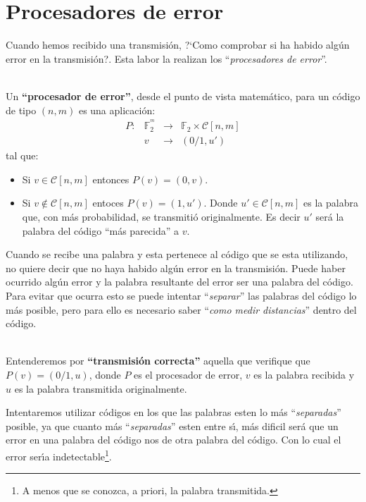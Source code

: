 \section{Procesadores de error}\label{sec:ProcErr}

Cuando hemos recibido una transmisi\'on, ?`Como comprobar si ha habido alg\'un
error en la transmisi\'on?. Esta labor la realizan los ``\emph{procesadores de
error}''.
\begin{definicion}
\ \\
Un \textbf{``procesador de error''}, desde el punto de vista matem\'atico, 
para un c\'odigo de tipo $(n,m)$ es una aplicaci\'on:
\begin{displaymath}
\begin{array}{cccc}
P:&\mathbb{F}^{^m}_2&\longrightarrow & \mathbb{F}_2\times \mathcal{C}[n,m] \\
 & v&\longrightarrow & (0/1,u')
\end{array}
\end{displaymath}
tal que:
\begin{itemize}
\item Si $v \in \mathcal{C}[n,m]$ entonces $P(v)=(0,v)$.
\item Si $v \notin \mathcal{C}[n,m]$ entoces $P(v)=(1,u')$. Donde $u'\in
\mathcal{C}[n,m]$ es la palabra que, con m\'as probabilidad, se transmiti\'o
originalmente. Es decir $u'$ ser\'a la palabra del c\'odigo ``m\'as parecida''
a $v$.
\end{itemize}
\end{definicion}
%
Cuando se recibe una palabra y esta pertenece al c\'odigo que se esta utilizando, no quiere decir que no haya habido alg\'un error en la transmisi\'on. Puede haber ocurrido alg\'un error y la palabra resultante del error ser una palabra del c\'odigo. Para evitar que ocurra esto se puede intentar ``\emph{separar}'' las palabras del c\'odigo lo m\'as posible, pero para ello es necesario saber ``\emph{como medir distancias}'' dentro del c\'odigo.
%
\begin{definicion}
\ \\
Entenderemos por \textbf{``transmisi\'on correcta''} aquella que verifique que $P(v)=(0/1,u)$, donde $P$ es el procesador de error, $v$ es la palabra recibida y $u$ es la palabra transmitida originalmente.
\end{definicion}
%
Intentaremos utilizar c\'odigos en los que las palabras esten lo m\'as ``\emph{separadas}'' posible, ya que cuanto m\'as ``\emph{separadas}'' esten
entre s\'{\i}, m\'as dificil ser\'a que un error en una palabra del c\'odigo nos de otra palabra del c\'odigo. Con lo cual el error ser\'{\i}a indetectable\footnote{A menos que se conozca, a priori, la palabra transmitida.}.\\

